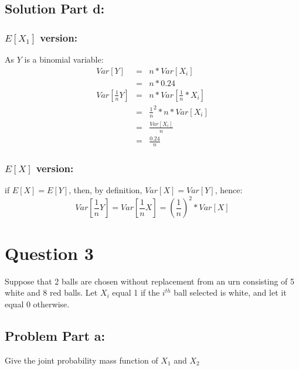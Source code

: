 \documentclass[12pt]{article}%
\begin{document}
\subsection*{Solution Part d:}
\subsubsection*{$E[X_1]$ version:}
As $Y$ is a binomial variable: 
\begin{eqnarray*}
    Var[Y]  & = & n * Var[X_i] \\
    		 & = & n * 0.24 \\
    Var[\frac{1}{n}Y]  & = & n * Var[\frac{1}{n} * X_i] \\
    				   & = & \frac{1}{n}^2 * n * Var[X_i] \\
    				   & = & \frac{Var[X_i]}{n} \\	
    				   & = & \frac{0.24}{n}		  
\end{eqnarray*}
\subsubsection*{$E[X]$ version:}
if $E[X] = E[Y]$, then, by definition, $Var[X]=Var[Y]$, hence:
\begin{equation*}
Var[\frac{1}{n}Y]=Var[\frac{1}{n}X]=(\frac{1}{n})^2*Var[X]
\end{equation*} 
\newpage
\section*{Question 3}
Suppose that 2 balls are chosen without replacement from an urn consisting of 5 white and 8 red balls. Let $X_i$ equal 1 if the $i^{th}$ ball selected is white, and let it equal 0 otherwise.
\subsection*{Problem Part a:}
Give the joint probability mass function of $X_1$ and $X_2$
\end{document}
